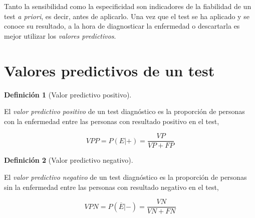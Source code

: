 \documentclass[
  spanish,
  a4paper,
]{scrreport}
\theoremstyle{definition}
\newtheorem{definition}{Definición}[chapter]
\theoremstyle{definition}
\theoremstyle{remark}
\begin{document}
Tanto la sensibilidad como la especificidad son indicadores de la
fiabilidad de un test \emph{a priori}, es decir, antes de aplicarlo. Una
vez que el test se ha aplicado y se conoce su resultado, a la hora de
diagnosticar la enfermedad o descartarla es mejor utilizar los
\emph{valores predictivos}.

\section{Valores predictivos de un
test}\label{valores-predictivos-de-un-test}

\begin{definition}[Valor predictivo
positivo]\protect\hypertarget{def-valor-predictivo-positivo}{}\label{def-valor-predictivo-positivo}

El \emph{valor predictivo positivo} de un test diagnóstico es la
proporción de personas con la enfermedad entre las personas con
resultado positivo en el test,

\[VPP = P(E|+) = \frac{VP}{VP+FP}\]

\end{definition}

\begin{definition}[Valor predictivo
negativo]\protect\hypertarget{def-valor-predictivo-negativo}{}\label{def-valor-predictivo-negativo}

El \emph{valor predictivo negativo} de un test diagnóstico es la
proporción de personas sin la enfermedad entre las personas con
resultado negativo en el test,

\[VPN = P(\overline{E}|-) = \frac{VN}{VN+FN}\]

\end{definition}
\end{document}
